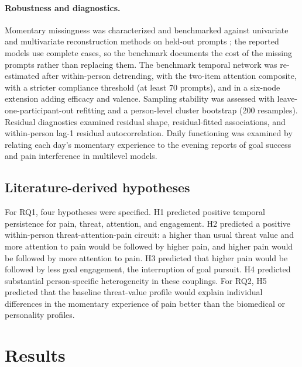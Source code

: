\documentclass[11pt,a4paper]{article}
\begin{document}
\paragraph{Robustness and diagnostics.} Momentary missingness was characterized and benchmarked
against univariate and multivariate reconstruction methods on held-out prompts
\citep{moritz2017imputets}; the reported models use complete cases, so the benchmark documents
the cost of the missing prompts rather than replacing them. The benchmark temporal network was re-estimated after
within-person detrending, with the two-item attention composite, with a stricter compliance
threshold (at least 70 prompts), and in a six-node extension adding efficacy and valence.
Sampling stability was assessed with leave-one-participant-out refitting and a person-level
cluster bootstrap (200 resamples). Residual diagnostics examined residual shape, residual-fitted
associations, and within-person lag-1 residual autocorrelation. Daily functioning was examined
by relating each day's momentary experience to the evening reports of goal success and pain
interference in multilevel models.

\subsection{Literature-derived hypotheses}
For RQ1, four hypotheses were specified. H1 predicted positive temporal persistence for pain,
threat, attention, and engagement. H2 predicted a positive within-person threat-attention-pain
circuit: a higher than usual threat value and more attention to pain would be followed by higher
pain, and higher pain would be followed by more attention to pain. H3 predicted that higher pain
would be followed by less goal engagement, the interruption of goal pursuit. H4 predicted
substantial person-specific heterogeneity in these couplings. For RQ2, H5 predicted that the
baseline threat-value profile would explain individual differences in the momentary experience of
pain better than the biomedical or personality profiles.

\section{Results}
\end{document}
